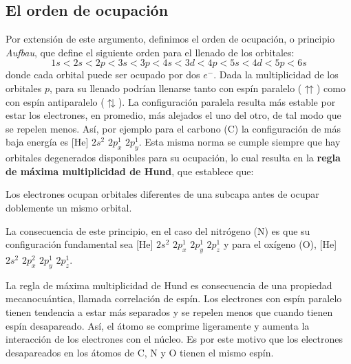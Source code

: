 \subsection{El orden de ocupación}
Por extensión de este argumento, definimos el orden de ocupación,
o principio \textit{Aufbau}, que define el siguiente orden para el 
llenado de los orbitales:
\begin{equation*}
    1s < 2s < 2p < 3s<  3p <4s < 3d < 4p < 5s < 4d < 5p < 6s
\end{equation*}
donde cada orbital puede ser ocupado por dos $e^{-}$. 
Dada la multiplicidad de los orbitales $p$, para su llenado podrían
llenarse tanto con espín paralelo ($\upuparrows$) como con espín antiparalelo 
($\updownarrows$). La configuración paralela resulta más estable por estar
los electrones, en promedio, más alejados el uno del otro, de
tal modo que se repelen menos.
Así, por ejemplo para el carbono (C) la configuración de más baja energía 
es [He] $2s^2$ $2p_x^1$ $2p_y^1$. Esta misma norma se cumple 
siempre que hay orbitales degenerados disponibles para su ocupación,
lo cual resulta en la \textbf{regla de máxima multiplicidad de Hund},
que establece que:
\begin{displayquote}
Los electrones ocupan orbitales diferentes de una subcapa antes 
de ocupar doblemente un mismo orbital.
\end{displayquote}
La consecuencia de este principio, en el caso del nitrógeno (N) es
que su configuración fundamental sea [He] $2s^2$ $2p_x^1$ $2p_y^1$ $2p_z^1$
y para el oxígeno (O), [He] $2s^2$ $2p_x^2$ $2p_y^1$ $2p_z^1$.

La regla de máxima multiplicidad de Hund es consecuencia de una
propiedad mecanocuántica, llamada correlación de espín. Los electrones
con espín paralelo tienen tendencia a estar más separados y se repelen
menos que cuando tienen espín desapareado. Así, el átomo se comprime
ligeramente y aumenta la interacción de los electrones con el núcleo.
Es por este motivo que los electrones desapareados en los átomos de C,
N y O tienen el mismo espín.